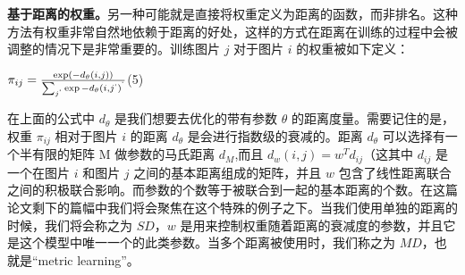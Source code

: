 \documentclass[a4paper,twocolumn]{ctexart}
\begin{document}
\textbf{基于距离的权重。}\quad 另一种可能就是直接将权重定义为距离的函数，而非排名。这种方法有权重非常自然地依赖于距离的好处，这样的方式在距离在训练的过程中会被调整的情况下是非常重要的。训练图片 \(j\) 对于图片 \(i\) 的权重被如下定义：
\begin{center}
\(\pi_{ij} = \frac{\exp(-d_{\theta}(i,j))}{{\sum_{j^`}\exp{-d_{\theta}(i,j^`)}}^`}\)\quad(5)
\end{center}
在上面的公式中 \(d_{\theta}\) 是我们想要去优化的带有参数 \(\theta\) 的距离度量。需要记住的是，权重 \(\pi_{ij}\) 相对于图片 \(i\) 的距离 \(d_{\theta}\) 是会进行指数级的衰减的。距离 \(d_{\theta}\) 可以选择有一个半有限的矩阵 M 做参数的马氏距离 \(d_{M}\),而且 \(d_{w}(i,j) = w^Td_{ij}\)（这其中 \(d_{ij}\) 是一个在图片 \(i\) 和图片 \(j\) 之间的基本距离组成的矩阵，并且 \(w\) 包含了线性距离联合之间的积极联合影响。而参数的个数等于被联合到一起的基本距离的个数。在这篇论文剩下的篇幅中我们将会聚焦在这个特殊的例子之下。当我们使用单独的距离的时候，我们将会称之为 \(SD\)，\(w\) 是用来控制权重随着距离的衰减度的参数，并且它是这个模型中唯一一个的此类参数。当多个距离被使用时，我们称之为 \(MD\)，也就是“metric learning”。



\newpage
\end{document}
